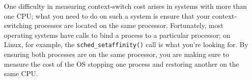 \documentclass[12pt]{article}
\begin{document}
\bigskip

One difficulty in measuring context-switch cost arises in systems with
more than one CPU; what you need to do on such a system is ensure that
your context-switching processes are located on the same processor.
Fortunately, most operating systems have calls to bind a process to a
particular processor; on Linux, for example, the \texttt{sched\_setaffinity()} call
is what you’re looking for. By ensuring both processes are on the same
processor, you are making sure to measure the cost of the OS stopping
one process and restoring another on the same CPU.
\end{document}
